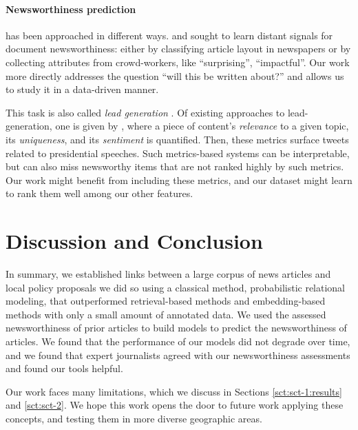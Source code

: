 \documentclass[11pt]{article}
\begin{document}
\paragraph{Newsworthiness prediction} has been approached in different ways. \cite{spangher2021modeling} and \cite{nishal2022crowd} sought to learn distant signals for document newsworthiness: either by classifying article layout in newspapers or by collecting attributes from crowd-workers, like ``surprising'', ``impactful''. Our work more directly addresses the question ``will this be written about?'' and allows us to study it in a data-driven manner.

This task is also called \textit{lead generation} \cite{cohen2011computational}. Of existing approaches to lead-generation, one is given by \citet{diakopoulos2010diamonds}, where a piece of content's \textit{relevance} to a given topic, its \textit{uniqueness}, and its \textit{sentiment} is quantified. Then, these metrics surface tweets related to presidential speeches. Such metrics-based systems can be interpretable, but can also miss newsworthy items that are not ranked highly by such metrics. Our work might benefit from including these metrics, and our dataset might learn to rank them well among our other features.


\section{Discussion and Conclusion}
\label{sct:discussion-and-conclusion}

In summary, we established links between a large corpus of news articles and local policy proposals we did so using a classical method, probabilistic relational modeling, that outperformed retrieval-based methods and embedding-based methods with only a small amount of annotated data. We used the assessed newsworthiness of prior articles to build models to predict the newsworthiness of articles. We found that the performance of our models did not degrade over time, and we found that expert journalists agreed with our newsworthiness assessments and found our tools helpful.

Our work faces many limitations, which we discuss in Sections \ref{sct:sct-1:results} and \ref{sct:sct-2}. %
We hope this work opens the door to future work applying these concepts, and testing them in more diverse geographic areas.
\end{document}
